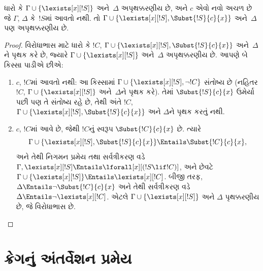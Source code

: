 \begin{lem}
ધારો કે $\Gamma \cup \{ \lexists[x][!S] \}$ અને~$\Delta$
અપૃથક્કરણીય છે, અને $c$ એવો નવો અચળ છે જે $\Gamma$,
$\Delta$ કે~$!S$માં આવતો નથી. તો $\Gamma \cup \{ \lexists[x][!S],
\Subst{!S}{c}{x} \}$ અને~$\Delta$ પણ અપૃથક્કરણીય છે.
\end{lem}

\begin{proof}
વિરોધાભાસ માટે ધારો કે $!C$, $\Gamma \cup \{ \lexists[x][!S],
\Subst{!S}{c}{x}\}$ અને~$\Delta$ને પૃથક કરે છે, જ્યારે $\Gamma \cup
\{\lexists[x][!S] \}$ અને~$\Delta$ અપૃથક્કરણીય છે. આપણે બે કિસ્સા
પાડીએ છીએ:
\begin{enumerate}
\item $c$, $!C$માં આવતો નથી: આ કિસ્સામાં $\Gamma \cup
  \{\lexists[x][!S], \lnot!C \}$ સંતોષ્ય છે (નહિતર $!C$, $\Gamma
  \cup \{\lexists[x][!S] \}$ અને~$\Delta$ને પૃથક કરે). તેમાં
  $\Subst{!S}{c}{x}$ ઉમેર્યા પછી પણ તે સંતોષ્ય રહે છે, તેથી અંતે
  $!C$, $\Gamma \cup \{ \lexists[x][!S], \Subst{!S}{c}{x} \}$ અને
  $\Delta$ને પૃથક કરતું નથી.
\item $c$, $!C$માં આવે છે, જેથી $!C$નું સ્વરૂપ
  $\Subst{!C}{c}{x}$ છે. ત્યારે
  \[
  \Gamma \cup \{ \lexists[x][!S], \Subst{!S}{c}{x}\} \Entails \Subst{!C}{c}{x},
  \]
  અને તેથી નિગમન પ્રમેય તથા સર્વત્રીકરણ વડે
  $\Gamma, \lexists[x][!S] \Entails \lforall[x][(!S \lif !C)]$,
  અને છેવટે $\Gamma \cup \{ \lexists[x][!S] \} \Entails
  \lexists[x][!C]$. બીજી તરફ, $\Delta \Entails \lnot
  \Subst{!C}{c}{x}$ અને તેથી સર્વત્રીકરણ વડે $\Delta \Entails \lnot
  \lexists[x][!C]$. એટલે $\Gamma \cup \{\lexists[x][!S] \}$ અને
  $\Delta$ પૃથક્કરણીય છે, જે વિરોધાભાસ છે.
\end{enumerate}
\end{proof}
\endgroup


\begingroup
\makeatletter{}\makeatother


\section{ક્રેગનું અંતર્વેશન પ્રમેય}
\label{guunit:OLP-0201}



